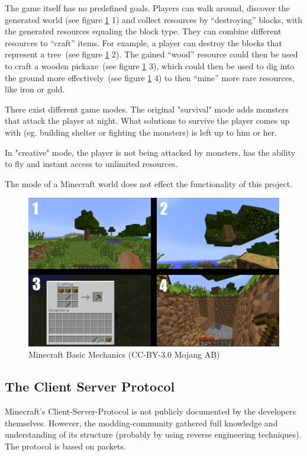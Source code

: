 The game itself has no predefined goals. Players can walk around, discover the generated world (see figure \ref{mc_mechanics} 1) and collect resources by ``destroying'' blocks, with the generated resources equaling the block type. They can combine different resources to ``craft'' items. For example, a player can destroy the blocks that represent a tree~(see figure \ref{mc_mechanics} 2). The gained ``wood'' resource could then be used to craft a wooden pickaxe~(see figure \ref{mc_mechanics} 3), which could then be used to dig into the ground more effectively~(see figure \ref{mc_mechanics} 4) to then ``mine'' more rare resources, like iron or gold.

There exist different game modes. The original "survival" mode adds monsters that attack the player at night. What solutions to survive the player comes up with (eg. building shelter or fighting the monsters) is left up to him or her.

In "creative" mode, the player is not being attacked by monsters, has the ability to fly and instant access to unlimited resources.

The mode of a Minecraft world does not effect the functionality of this project.

\begin{figure}[h]
  \centering
    \includegraphics[width=15cm]{graphics/minecraft_mechanics}
  \caption{Minecraft Basic Mechanics  (CC-BY-3.0 Mojang AB)}
  \label{mc_mechanics}
\end{figure}

        \subsection{The Client Server Protocol}
Minecraft's Client-Server-Protocol is not publicly documented by the developers themselves. However, the modding-community gathered full knowledge and understanding of its structure (probably by using reverse engineering techniques). The protocol is based on packets. 

